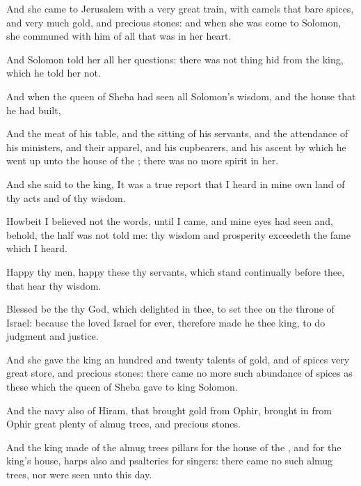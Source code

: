 {And she
came to
Jerusalem with a
very
great
train, with
camels that
bare
spices, and
very
much
gold, and
precious
stones: and when she was
come to
Solomon, she
communed with him of all that was in her
heart.

And
Solomon
told her all her
questions: there was not
{}
thing
hid from the
king, which he
told her not.

And when the
queen of
Sheba had
seen all
Solomon’s
wisdom, and the
house that he had
built,

And the
meat of his
table, and the
sitting of his
servants, and the
attendance of his
ministers, and their
apparel, and his
cupbearers, and his
ascent by which he went
up unto the
house of the
{}; there was no more
spirit in her.

And she
said to the
king, It was a
true
report that I
heard in mine own
land of thy
acts and of thy
wisdom.

Howbeit I
believed not the
words, until I
came, and mine
eyes had
seen
{} and, behold, the
half was not
told me: thy
wisdom and
prosperity
exceedeth the
fame which I
heard.

Happy
{} thy
men,
happy
{} these thy
servants, which
stand
continually
before thee,
{} that
hear thy
wisdom.

Blessed be the
{} thy
God, which
delighted in thee, to
set thee on the
throne of
Israel: because the
{}
loved
Israel for
ever, therefore
made he thee
king, to
do
judgment and
justice.

And she
gave the
king an
hundred and
twenty
talents of
gold, and of
spices
very great
store, and
precious
stones: there
came no more
such
abundance of
spices as these which the
queen of
Sheba
gave to
king
Solomon.

And the
navy also of
Hiram, that
brought
gold from
Ophir, brought
in from
Ophir
great
plenty of
almug
trees, and
precious
stones.

And the
king
made of the
almug
trees
pillars for the
house of the
{}, and for the
king’s
house,
harps also and
psalteries for
singers: there
came no such
almug
trees, nor were
seen unto this
day.

}
